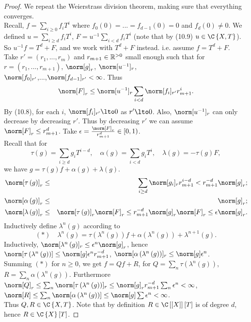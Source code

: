 \begin{proof}
We repeat the Weierstrass division theorem, making sure that everything
converges.\\
Recall, $f=\sum_{i\geq0}f_{i}T^{i}$ where $f_{0}\left(0\right)=...=f_{d-1}\left(0\right)=0$
and $f_{d}\left(0\right)\neq0$. We defined $u=\sum_{i\geq d}f_{i}T^{i}$,
$F=u^{-1}\sum_{i<d}f_{i}T^{i}$ (note that by (10.9) $u\in\C\left\{ X,T\right\} $).
So $u^{-1}f=T^{d}+F$, and we work with $T^{d}+F$ instead. i.e. assume
$f=T^{d}+F$.\\
Take $r'=\left(r_{1},...,r_{m}\right)$ and $r_{m+1}\in\mathbb{R}^{>0}$ small
enough such that for $r=\left(r_{1},...,r_{m+1}\right)$, $\norm[g]_{r}$,
$\norm[u^{-1}]_{r}$, \\
$\norm[f_{0}]_{r'}$,...,$\norm[f_{d-1}]_{r'}<\infty$. Thus 
\[
\norm[F]_{r}\leq\norm[u^{-1}]_{r}\sum_{i<d}\norm[f_{i}]_{r'}r_{m+1}^{i}.
\]
By (10.8), for each $i$, $\norm[f_{i}]_{r'}\lto0$ as $r'\lto0$.
Also, $\norm[u^{-1}]_{r}$ can only decrease by decreasing $r'$.
Thus by decreasing $r'$ we can assume $\norm[F]_{r}\leq r_{m+1}^{d}$.
Take $\epsilon=\frac{\norm[F]_{r}}{r_{m+1}^{d}}\in\left[0,1\right)$.
\\
Recall that for 
\[
\tau\left(g\right)=\sum_{i\geq d}g_{i}T^{i-d},\quad\alpha\left(g\right)=\sum_{i<d}g_{i}T^{i},\quad\lambda\left(g\right)=-\tau\left(g\right)F,
\]
we have $g=\tau\left(g\right)f+\alpha\left(g\right)+\lambda\left(g\right)$.
\begin{align*}
\norm[\tau\left(g\right)]_{r} & \leq & \sum_{i\geq d}\norm[g_{i}]_{r}r_{m+1}^{i-d}<r_{m+1}^{-d}\norm[g]_{r};\\
\norm[\alpha\left(g\right)]_{r} & \leq & \norm[g]_{r};\\
\norm[\lambda\left(g\right)]_{r} & \leq & \norm[\tau\left(g\right)]_{r}\norm[F]_{r}\leq r_{m+1}^{-d}\norm[g]_{r}\norm[F]_{r}\leq\epsilon\norm[g]_{r}.
\end{align*}
Inductively define $\lambda^{n}\left(g\right)$ according to 
\[
\left(\ast\right)\quad\lambda^{n}\left(g\right)=\tau\left(\lambda^{n}\left(g\right)\right)f+\alpha\left(\lambda^{n}\left(g\right)\right)+\lambda^{n+1}\left(g\right).
\]
Inductively, $\norm[\lambda^{n}\left(g\right)]_{r}\leq\epsilon^{n}\norm[g]_{r}$,
hence $\norm[\tau\left(\lambda^{n}\left(g\right)\right)]\leq\norm[g]\epsilon^{n}r_{m+1}^{-d}$,
$\norm[\alpha\left(\lambda^{n}\left(g\right)\right)]_{r}\leq\norm[g]\epsilon^{n}$.\\
Summing $\left(\ast\right)$ for $n\geq0$, we get $f=Qf+R$, for
$Q=\sum_{n}\tau\left(\lambda^{n}\left(g\right)\right)$, $R=\sum_{n}\alpha\left(\lambda^{n}\left(g\right)\right)$.
Furthermore $\norm[Q]_{r}\leq\sum_{n}\norm[\tau\left(\lambda^{n}\left(g\right)\right)]_{r}\leq\norm[g]_{r}r_{m+1}^{-d}\sum_{n}\epsilon^{n}<\infty$,
$\norm[R]\leq\sum_{n}\norm[\alpha\left(\lambda^{n}\left(g\right)\right)]\leq\norm[g]\sum\epsilon^{n}<\infty$.
\\
Thus $Q,R\in\C\left\{ X,T\right\} $. Note that by definition $R\in\C\left[\left[X\right]\right]\left[T\right]$
is of degree $d$, hence $R\in\C\left\{ X\right\} \left[T\right]$.\end{proof}

